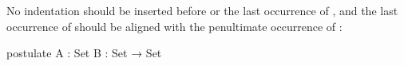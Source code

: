 \documentclass{article}
\begin{document}
No indentation should be inserted before  or
the last occurrence of , and the last
occurrence of  should be aligned with the
penultimate occurrence of :
\begin{code}
  postulate
    A  : Set
    B  : Set →
         Set
\end{code}
\end{document}
